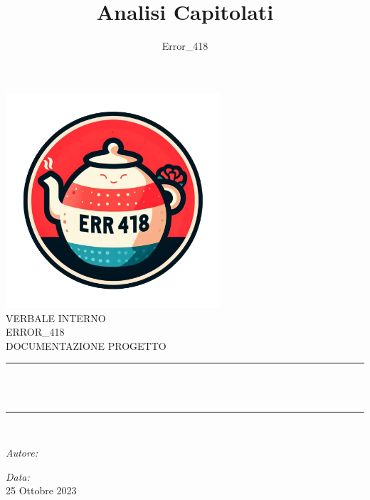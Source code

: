 \documentclass[a4paper, twoside]{article}
\title{\Huge Analisi Capitolati}
\author{Error\_418}
\newcommand{\HRule}{\rule{\linewidth}{0.5mm}}
\begin{document}
\sffamily
\begin{titlepage}
\centering
\includegraphics[width=8cm]{logo.png}\\[1.5cm]
\center %
\textsf{\Huge VERBALE INTERNO}\\[2cm]
\textsf{\Large ERROR\_418}\\[0.5cm]
\textsf{\Large DOCUMENTAZIONE PROGETTO}\\[0.5cm]
\makeatletter
\HRule \\[0.4cm]
{ \huge \bfseries \@title}\\[0.4cm]
\HRule \\[1.5cm]
\begin{minipage}{0.4\textwidth}
\begin{flushleft} \large
\emph{Autore:}\\
\@author %
\end{flushleft}
\end{minipage}
\begin{minipage}{0.4\textwidth}
\begin{flushright} \large
\emph{Data:}\\
{\large 25 Ottobre 2023}\\[1cm]
\end{flushright}
\end{minipage}


\end{titlepage}
\end{document}
